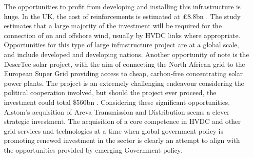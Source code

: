 The opportunities to profit from developing and installing this infrastructure is huge.
In the UK, the cost of reinforcements is estimated at \pounds8.8bn \cite{NetworkStrategyGroup}. 
The study estimates that a large majority of the investment will be required for the connection of on and offshore wind, usually by HVDC links where appropriate.
Opportunities for this type of large infrastructure project are at a global scale, and include developed and developing nations.
Another opportunity of note is the DeserTec solar project, with the aim of connecting the North African grid to the European Super Grid providing access to cheap, carbon-free concentrating solar power plants. 
The project is an extremely challenging endeavour considering the political cooperation involved, but should the project ever proceed, the investment could total \$560bn \cite{DesertTec}.
Considering these significant opportunities, Alstom's acquisition of Areva Transmission and Distribution seems a clever strategic investment.
The acquisition of a core competence in HVDC and other grid services and technologies at a time when global government policy is promoting renewed investment in the sector is clearly an attempt to align with the opportunities provided by emerging Government policy.



